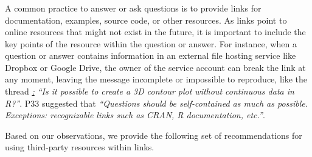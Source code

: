 \subsubsection{\recd}

    A common practice to answer or ask questions is to provide links for documentation, examples, source code, or other resources.
    As links point to online resources that might not exist in the future, it is important to include the key points of the resource within the question or answer.
    For instance, when a question or answer contains information in an external file hosting service like Dropbox or Google Drive, the owner of the service account can break the link at any moment, leaving the message incomplete or impossible to reproduce, like the thread \textit{\href{http://goo.gl/5nanFU}: {``Is it possible to create a 3D contour plot without continuous data in R?''}}.
    P33 suggested that \textit{``Questions should be self-contained as much as possible. Exceptions: recognizable links such as CRAN, R documentation, etc.''}.

    Based on our observations, we provide the following set of recommendations for using third-party resources within links.

